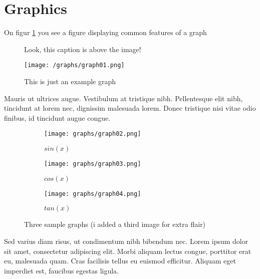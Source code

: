 \section{Graphics}
On figur \ref{fig:test-graph} you see a figure displaying common features of a graph
\begin{figure}[h]
\centering
\caption{Look, this caption is above the image!}
\texttt{[image: /graphs/graph01.png]}
\caption{This is just an example graph}
\label{fig:test-graph}
\end{figure}

Mauris ut ultrices augue. Vestibulum at tristique nibh. Pellentesque elit nibh, tincidunt at lorem nec, dignissim malesuada lorem. Donec tristique nisi vitae odio finibus, id tincidunt augue congue.

\begin{figure}
    \centering
    \begin{subfigure}[b]{0.3\textwidth}
        \centering
        \texttt{[image: graphs/graph02.png]}
        \caption{$sin(x)$}
        \label{fig:sin(x)}
    \end{subfigure}
    \hfill %
    \begin{subfigure}[b]{0.3\textwidth}
        \centering
        \texttt{[image: graphs/graph03.png]}
        \caption{$cos(x)$}
        \label{fig:cos(x)}
    \end{subfigure}
    \hfill %
    \begin{subfigure}[b]{0.3\textwidth}
        \centering
        \texttt{[image: graphs/graph04.png]}
        \caption{$tan(x)$}
        \label{fig:tan(x)}
    \end{subfigure}
    \caption{Three sample graphs (i added a third image for extra flair)}
    \label{fig: three graphs}
\end{figure}

Sed varius diam risus, ut condimentum nibh bibendum nec. Lorem ipsum dolor sit amet, consectetur adipiscing elit. Morbi aliquam lectus congue, porttitor erat eu, malesuada quam. Cras facilisis tellus eu euismod efficitur. Aliquam eget imperdiet est, faucibus egestas ligula.\\